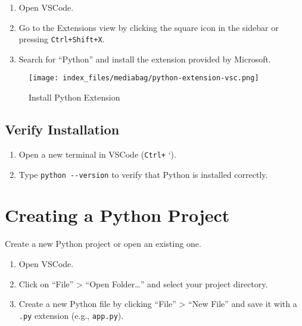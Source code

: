 \documentclass[
  letterpaper,
  DIV=11,
  numbers=noendperiod]{scrreprt}
\providecommand{\tightlist}{%
  \setlength{\itemsep}{0pt}\setlength{\parskip}{0pt}}\usepackage{longtable,booktabs,array}
\begin{document}
\begin{enumerate}
\def\labelenumi{\arabic{enumi}.}
\tightlist
\item
  Open VSCode.
\item
  Go to the Extensions view by clicking the square icon in the sidebar
  or pressing \texttt{Ctrl+Shift+X}.
\item
  Search for ``Python'' and install the extension provided by Microsoft.
\end{enumerate}

\begin{figure}[H]

{\centering \texttt{[image: index\_files/mediabag/python-extension-vsc.png]}

}

\caption{Install Python Extension}

\end{figure}%

\subsection{Verify Installation}\label{verify-installation}

\begin{enumerate}
\def\labelenumi{\arabic{enumi}.}
\tightlist
\item
  Open a new terminal in VSCode (\texttt{Ctrl+} `).
\item
  Type \texttt{python\ -\/-version} to verify that Python is installed
  correctly.
\end{enumerate}

\section{Creating a Python Project}\label{creating-a-python-project}

Create a new Python project or open an existing one.

\begin{enumerate}
\def\labelenumi{\arabic{enumi}.}
\tightlist
\item
  Open VSCode.
\item
  Click on ``File'' \textgreater{} ``Open Folder\ldots{}'' and select
  your project directory.
\item
  Create a new Python file by clicking ``File'' \textgreater{} ``New
  File'' and save it with a \texttt{.py} extension (e.g.,
  \texttt{app.py}).
\end{enumerate}
\end{document}
